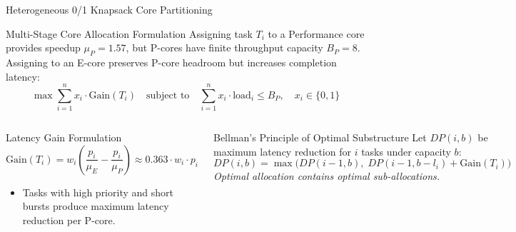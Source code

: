 \documentclass{beamer}
\begin{document}
\begin{frame}{Heterogeneous 0/1 Knapsack Core Partitioning}
  \begin{block}{Multi-Stage Core Allocation Formulation}
    \footnotesize
    Assigning task $T_i$ to a Performance core provides speedup $\mu_P = 1.57$, but P-cores have finite throughput capacity $B_P = 8$. Assigning to an E-core preserves P-core headroom but increases completion latency:
    $$\max \sum_{i=1}^n x_i \cdot \text{Gain}(T_i) \quad \text{subject to} \quad \sum_{i=1}^n x_i \cdot \text{load}_i \le B_P, \quad x_i \in \{0, 1\}$$
  \end{block}

  \vspace{0.15cm}
  \begin{columns}[T]
      \begin{exampleblock}{Latency Gain Formulation}
        \scriptsize
        $$\text{Gain}(T_i) = w_i \left( \frac{p_i}{\mu_E} - \frac{p_i}{\mu_P} \right) \approx 0.363 \cdot w_i \cdot p_i$$
        \begin{itemize}\itemsep2pt\tiny
          \item Tasks with high priority and short bursts produce maximum latency reduction per P-core.
        \end{itemize}
      \end{exampleblock}

      \begin{alertblock}{Bellman's Principle of Optimal Substructure}
        \scriptsize
        Let $DP(i, b)$ be maximum latency reduction for $i$ tasks under capacity $b$:
        {\tiny
        \begin{equation*}
          DP(i, b) = \max \big( DP(i-1, b), \; DP(i-1, b - l_i) + \text{Gain}(T_i) \big)
        \end{equation*}
        }
        \textit{Optimal allocation contains optimal sub-allocations.}
      \end{alertblock}
  \end{columns}
\end{frame}
\end{document}
